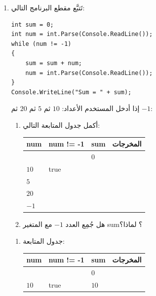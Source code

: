 \documentclass[14pt]{extarticle}
\begin{document}
\begin{enumerate}[itemsep=2em]
\item تَتبَّع مقطع البرنامج التالي:
\begin{boxCode}
\begin{english}
\begin{verbatim}
int sum = 0;
int num = int.Parse(Console.ReadLine());
while (num != -1)
{
    sum = sum + num;
    num = int.Parse(Console.ReadLine());
}
Console.WriteLine("Sum = " + sum);
\end{verbatim}
\end{english}
\end{boxCode}
إذا أدخل المستخدم الأعداد: $10$ ثم $5$ ثم $20$ ثم $-1$:
\begin{enumerate}
    \item أكمل جدول المتابعة التالي:
    \begin{center}
    \begin{english}
    \renewcommand{\arraystretch}{1.4}
    \begin{tabular}{|C{2.5cm}|C{3.5cm}|C{2.5cm}|C{3.5cm}|}
    \hline
    \textbf{num} & \textbf{num != -1} & \textbf{sum} & \textarabic{\textbf{المخرجات}} \\
    \hline
     & & $0$ & \\ \hline
    $10$ & \textenglish{true} & & \\ \hline
    $5$ & & & \\ \hline
    $20$ & & & \\ \hline
    $-1$ & & & \\ \hline
    \end{tabular}
    \end{english}
    \end{center}
    \item هل جُمِع العدد $-1$ مع المتغير \textenglish{sum}؟ لماذا؟
\end{enumerate}
\ifwithsols
\begin{boxSolution}
\begin{enumerate}
    \item جدول المتابعة:
    \begin{center}
    \begin{english}
    \renewcommand{\arraystretch}{1.4}
    \begin{tabular}{|C{2.5cm}|C{3.5cm}|C{2.5cm}|C{3.5cm}|}
    \hline
    \textbf{num} & \textbf{num != -1} & \textbf{sum} & \textarabic{\textbf{المخرجات}} \\
    \hline
     & & $0$ & \\ \hline
    $10$ & \textenglish{true} & $10$ & \\ \hline

\end{tabular}
\end{english}
\end{center}
\end{enumerate}
\end{boxSolution}
\end{enumerate}
\end{document}
